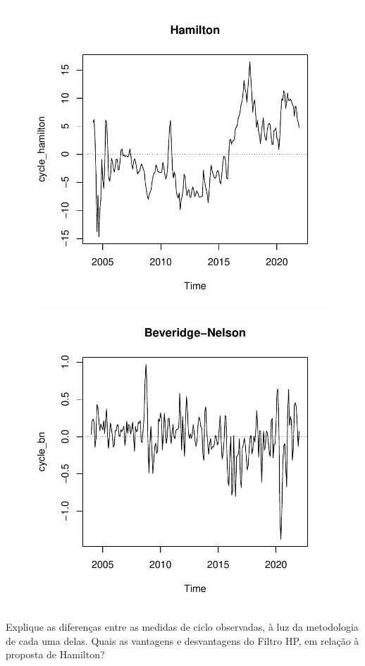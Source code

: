 \documentclass[10pt,a4paper]{article}
\begin{document}
\begin{enumerate}
\begin{figure}[H]
					\includegraphics[scale=0.47]{hamilton.pdf}
					\includegraphics[scale=0.47]{bn.pdf}
				\end{figure}
				
				Explique as diferenças entre as medidas de ciclo observadas, à luz da metodologia de cada uma delas. Quais as vantagens e desvantagens do Filtro HP, em relação à proposta de Hamilton?
			\end{enumerate}
			
	
\end{document}
